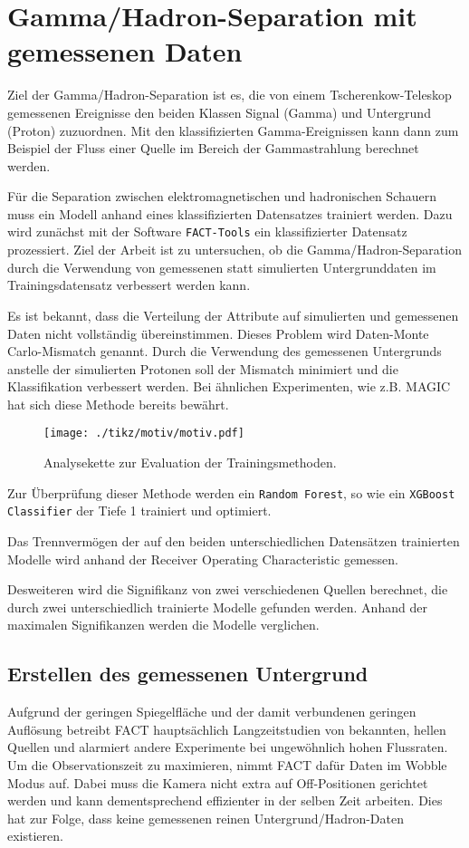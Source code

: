 \chapter{Gamma/Hadron-Separation mit gemessenen Daten}
Ziel der Gamma/Hadron-Separation ist es, die von einem Tscherenkow-Teleskop gemessenen Ereignisse den beiden Klassen Signal (Gamma) und Untergrund (Proton) zuzuordnen.
Mit den klassifizierten Gamma-Ereignissen kann dann zum Beispiel der Fluss einer Quelle im Bereich der Gammastrahlung berechnet werden.

Für die Separation zwischen elektromagnetischen und hadronischen Schauern muss ein Modell anhand eines klassifizierten Datensatzes trainiert werden.
Dazu wird zunächst mit der Software \texttt{FACT-Tools} \cite{Bockermann} ein klassifizierter Datensatz prozessiert.
Ziel der Arbeit ist zu untersuchen, ob die Gamma/Hadron-Separation durch die Verwendung von gemessenen statt simulierten Untergrunddaten im Trainingsdatensatz verbessert werden kann.

Es ist bekannt, dass die Verteilung der Attribute auf simulierten und gemessenen Daten nicht vollständig übereinstimmen.
Dieses Problem wird Daten-Monte Carlo-Mismatch genannt.
Durch die Verwendung des gemessenen Untergrunds anstelle der simulierten Protonen soll der Mismatch minimiert und die Klassifikation verbessert werden.
Bei ähnlichen Experimenten, wie z.B. MAGIC \cite{magic} hat sich diese Methode bereits bewährt. 
\begin{figure}[H]
  \centering
  \texttt{[image: ./tikz/motiv/motiv.pdf]}
  \caption{Analysekette zur Evaluation der Trainingsmethoden.}
\end{figure}
Zur Überprüfung dieser Methode werden ein \texttt{Random Forest}, so wie ein \texttt{XGBoost Classifier} der Tiefe 1 trainiert und optimiert.

Das Trennvermögen der auf den beiden unterschiedlichen Datensätzen trainierten Modelle wird anhand der Receiver Operating Characteristic gemessen.

Desweiteren wird die Signifikanz von zwei verschiedenen Quellen berechnet, die durch zwei unterschiedlich trainierte Modelle gefunden werden. 
Anhand der maximalen Signifikanzen werden die Modelle verglichen.
\section{Erstellen des gemessenen Untergrund}
\label{sec:makeUnter}
Aufgrund der geringen Spiegelfläche und der damit verbundenen geringen Auflösung betreibt FACT hauptsächlich Langzeitstudien von bekannten, hellen Quellen und alarmiert andere Experimente bei ungewöhnlich hohen Flussraten.
Um die Observationszeit zu maximieren, nimmt FACT dafür Daten im Wobble Modus auf. 
Dabei muss die Kamera nicht extra auf Off-Positionen gerichtet werden und kann dementsprechend effizienter in der selben Zeit arbeiten. 
Dies hat zur Folge, dass keine gemessenen reinen Untergrund/Hadron-Daten existieren. 

